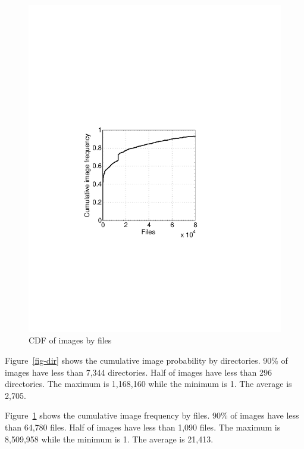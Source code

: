 \begin{figure}
\begin{minipage}{0.23\textwidth}
		\includegraphics[width=1\textwidth]{graphs/file.pdf}
		\caption{CDF of images by files}
		\label{fig-file}
	\end{minipage}
\end{figure}

Figure~\ref{fig-dir} shows the cumulative image probability by directories. 90\% of images have less than 7,344 directories. Half of images have less than 296 directories. The maximum is 1,168,160 while the minimum is 1. The average is 2,705. 

Figure~\ref{fig-file} shows the cumulative image frequency by files. 90\% of images have less than 64,780 files. Half of images have less than 1,090 files. The maximum is 8,509,958 while the minimum is 1. The average is 21,413.
